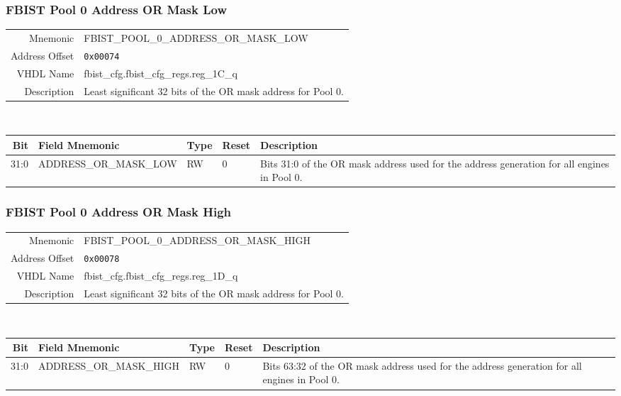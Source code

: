 \subsubsection{FBIST Pool 0 Address OR Mask Low}
\begin{tabular}{ r | p{350px} }
  Mnemonic       & FBIST\_POOL\_0\_ADDRESS\_OR\_MASK\_LOW  \\
  Address Offset & \texttt{0x00074}                        \\
  VHDL Name      &  fbist\_cfg.fbist\_cfg\_regs.reg\_1C\_q \\ \hline

  Description &
  Least significant 32 bits of the OR mask address for Pool 0. \\
\end{tabular}
\\
\begin{tabularx}{\textwidth}{r|l|l|l|X}
  \hline
  Bit   & Field Mnemonic         & Type & Reset & Description \\ \hline

  31:0  & ADDRESS\_OR\_MASK\_LOW & RW   & 0     &

  Bits 31:0 of the OR mask address used for the address generation
  for all engines in Pool 0. \\
\end{tabularx}

\subsubsection{FBIST Pool 0 Address OR Mask High}
\begin{tabular}{ r | p{350px} }
  Mnemonic       & FBIST\_POOL\_0\_ADDRESS\_OR\_MASK\_HIGH \\
  Address Offset & \texttt{0x00078}                        \\
  VHDL Name      &  fbist\_cfg.fbist\_cfg\_regs.reg\_1D\_q \\ \hline

  Description &
  Least significant 32 bits of the OR mask address for Pool 0. \\
\end{tabular}
\\
\begin{tabularx}{\textwidth}{r|l|l|l|X}
  \hline
  Bit   & Field Mnemonic          & Type & Reset & Description \\ \hline

  31:0  & ADDRESS\_OR\_MASK\_HIGH & RW   & 0     &

  Bits 63:32 of the OR mask address used for the address generation
  for all engines in Pool 0. \\
\end{tabularx}

